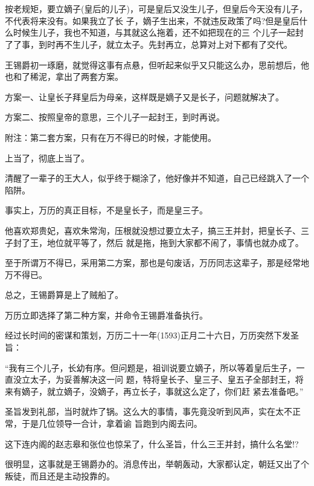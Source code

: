 \documentclass[11pt,a4paper,onecolumn]{article}
\begin{document}
\section[\thesection]{}

按老规矩，要立嫡子(皇后的儿子)，可是皇后又没生儿子，但皇后今天没有儿子，不代表将来没有。如果我立了长
子，嫡子生出来，不就违反政策了吗?但是皇后什么时候生儿子，我也不知道，与其就这么拖着，还不如把现在的三
个儿子一起封了了事，到时再不生儿子，就立太子。先封再立，总算对上对下都有了交代。

王锡爵初一琢磨，就觉得这事有点悬，但听起来似乎又只能这么办，思前想后，他也和了稀泥，拿出了两套方案。

方案一、让皇长子拜皇后为母亲，这样既是嫡子又是长子，问题就解决了。

方案二、按照皇帝的意思，三个儿子一起封王，到时再说。

附注：第二套方案，只有在万不得已的时候，才能使用。

上当了，彻底上当了。

清醒了一辈子的王大人，似乎终于糊涂了，他好像并不知道，自己已经跳入了一个陷阱。

事实上，万历的真正目标，不是皇长子，而是皇三子。

他喜欢郑贵妃，喜欢朱常洵，压根就没想过要立太子，搞三王并封，把皇长子、三子封了王，地位就平等了，然后
就是拖，拖到大家都不闹了，事情也就办成了。

至于所谓万不得已，采用第二方案，那也是句废话，万历同志这辈子，那是经常地万不得已。

总之，王锡爵算是上了贼船了。

万历立即选择了第二种方案，并命令王锡爵准备执行。

经过长时间的密谋和策划，万历二十一年(1593)正月二十六日，万历突然下发圣旨：

``我有三个儿子，长幼有序。但问题是，祖训说要立嫡子，所以等着皇后生子，一直没立太子，为妥善解决这一问
题，特将皇长子、皇三子、皇五子全部封王，将来有嫡子，就立嫡子，没嫡子，再立长子，事就这么定了，你们赶
紧去准备吧。''

圣旨发到礼部，当时就炸了锅。这么大的事情，事先竟没听到风声，实在太不正常，于是几位领导一合计，拿着谕
旨跑到内阁去问。

这下连内阁的赵志皋和张位也惊呆了，什么圣旨，什么三王并封，搞什么名堂!?

很明显，这事就是王锡爵办的。消息传出，举朝轰动，大家都认定，朝廷又出了个叛徒，而且还是主动投靠的。

\section[\thesection]{}
\end{document}
